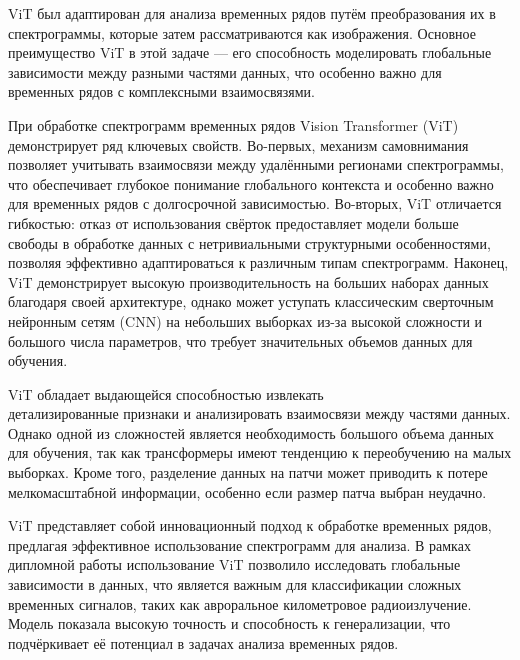 \documentclass[spec, och, diploma]{SCWorks}
\begin{document}
            ViT был адаптирован для анализа временных рядов путём преобразования
            их в спектрограммы, которые затем рассматриваются как изображения.
            Основное преимущество ViT в этой задаче — его способность
            моделировать глобальные зависимости между разными частями данных,
            что особенно важно для временных рядов с комплексными взаимосвязями.
            
            При обработке спектрограмм временных рядов Vision Transformer (ViT)
            демонстрирует ряд ключевых свойств. Во-первых, механизм самовнимания
            позволяет учитывать взаимосвязи между удалёнными регионами
            спектрограммы, что обеспечивает глубокое понимание глобального
            контекста и особенно важно для временных рядов с долгосрочной
            зависимостью. Во-вторых, ViT отличается гибкостью: отказ от
            использования свёрток предоставляет модели больше свободы в
            обработке данных с нетривиальными структурными особенностями,
            позволяя эффективно адаптироваться к различным типам спектрограмм.
            Наконец, ViT демонстрирует высокую производительность на больших
            наборах данных благодаря своей архитектуре, однако может уступать
            классическим сверточным нейронным сетям (CNN) на небольших выборках
            из-за высокой сложности и большого числа параметров, что требует
            значительных объемов данных для обучения.
            
            ViT обладает выдающейся способностью извлекать\\ детализированные
            признаки и анализировать взаимосвязи между частями данных. Однако
            одной из сложностей является необходимость большого объема данных
            для обучения, так как трансформеры имеют тенденцию к переобучению на
            малых выборках. Кроме того, разделение данных на патчи может
            приводить к потере мелкомасштабной информации, особенно если размер
            патча выбран неудачно.
            
            ViT представляет собой инновационный подход к обработке временных
            рядов, предлагая эффективное использование спектрограмм для анализа.
            В рамках дипломной работы использование ViT позволило исследовать
            глобальные зависимости в данных, что является важным для
            классификации сложных временных сигналов, таких как авроральное
            километровое радиоизлучение. Модель показала высокую точность и
            способность к генерализации, что подчёркивает её потенциал в задачах
            анализа временных рядов.
\end{document}

